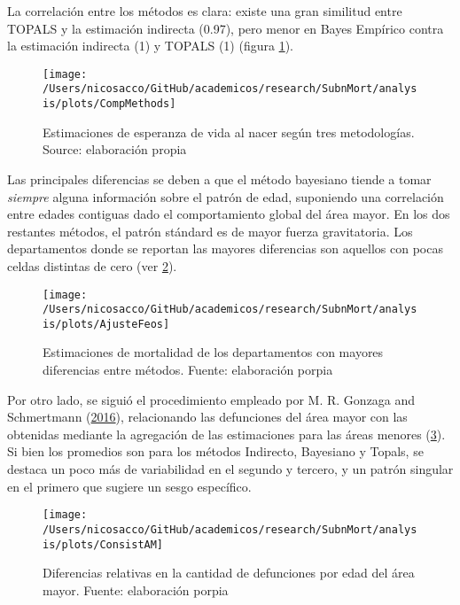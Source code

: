 \documentclass[12pt,]{article}
\begin{document}
La correlación entre los métodos es clara: existe una gran similitud
entre TOPALS y la estimación indirecta (0.97), pero menor en Bayes
Empírico contra la estimación indirecta (1) y TOPALS (1) (figura
\ref{fig:comparativeMeth}).

\begin{figure}

{\centering \texttt{[image: /Users/nicosacco/GitHub/academicos/research/SubnMort/analysis/plots/CompMethods]} 

}

\caption{Estimaciones de esperanza de vida al nacer según tres metodologías. Source: elaboración propia}\label{fig:comparativeMeth}
\end{figure}

Las principales diferencias se deben a que el método bayesiano tiende a
tomar \emph{siempre} alguna información sobre el patrón de edad,
suponiendo una correlación entre edades contiguas dado el comportamiento
global del área mayor. En los dos restantes métodos, el patrón stándard
es de mayor fuerza gravitatoria. Los departamentos donde se reportan las
mayores diferencias son aquellos con pocas celdas distintas de cero (ver
\ref{fig:Feos}).

\begin{figure}

{\centering \texttt{[image: /Users/nicosacco/GitHub/academicos/research/SubnMort/analysis/plots/AjusteFeos]} 

}

\caption{Estimaciones de mortalidad de los departamentos con mayores diferencias entre métodos. Fuente: elaboración porpia}\label{fig:Feos}
\end{figure}

Por otro lado, se siguió el procedimiento empleado por M. R. Gonzaga and
Schmertmann (\protect\hyperlink{ref-Gonzaga_Schmertmann_2016}{2016}),
relacionando las defunciones del área mayor con las obtenidas mediante
la agregación de las estimaciones para las áreas menores
(\ref{fig:consistAM}). Si bien los promedios son para los métodos
Indirecto, Bayesiano y Topals, se destaca un poco más de variabilidad en
el segundo y tercero, y un patrón singular en el primero que sugiere un
sesgo específico.

\begin{figure}

{\centering \texttt{[image: /Users/nicosacco/GitHub/academicos/research/SubnMort/analysis/plots/ConsistAM]} 

}

\caption{Diferencias relativas en la cantidad de defunciones por edad del área mayor. Fuente: elaboración porpia}\label{fig:consistAM}
\end{figure}
\end{document}
